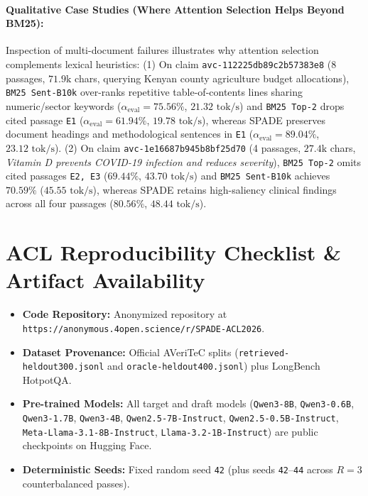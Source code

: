 \documentclass[11pt]{article}
\begin{document}
\paragraph{Qualitative Case Studies (Where Attention Selection Helps Beyond BM25):}
Inspection of multi-document failures illustrates why attention selection complements lexical heuristics: (1) On claim \texttt{avc-112225db89c2b57383e8} (8 passages, $71.9\text{k}$ chars, querying Kenyan county agriculture budget allocations), \texttt{BM25 Sent-B10k} over-ranks repetitive table-of-contents lines sharing numeric/sector keywords ($\alpha_{\text{eval}} = 75.56\%$, $21.32\text{ tok/s}$) and \texttt{BM25 Top-2} drops cited passage \texttt{E1} ($\alpha_{\text{eval}} = 61.94\%$, $19.78\text{ tok/s}$), whereas SPADE preserves document headings and methodological sentences in \texttt{E1} ($\alpha_{\text{eval}} = 89.04\%$, $23.12\text{ tok/s}$). (2) On claim \texttt{avc-1e16687b945b8bf25d70} (4 passages, $27.4\text{k}$ chars, \textit{Vitamin D prevents COVID-19 infection and reduces severity}), \texttt{BM25 Top-2} omits cited passages \texttt{E2, E3} ($69.44\%$, $43.70\text{ tok/s}$) and \texttt{BM25 Sent-B10k} achieves $70.59\%$ ($45.55\text{ tok/s}$), whereas SPADE retains high-saliency clinical findings across all four passages ($80.56\%$, $48.44\text{ tok/s}$).

\clearpage
\section{ACL Reproducibility Checklist \& Artifact Availability}
\label{app:reproducibility}
\begin{itemize}
    \item \textbf{Code Repository:} Anonymized repository at \nolinkurl{https://anonymous.4open.science/r/SPADE-ACL2026}.
    \item \textbf{Dataset Provenance:} Official AVeriTeC splits (\nolinkurl{retrieved-heldout300.jsonl} and \nolinkurl{oracle-heldout400.jsonl}) plus LongBench HotpotQA.
    \item \textbf{Pre-trained Models:} All target and draft models (\texttt{Qwen3-8B}, \texttt{Qwen3-0.6B}, \texttt{Qwen3-1.7B}, \texttt{Qwen3-4B}, \texttt{Qwen2.5-7B-Instruct}, \texttt{Qwen2.5-0.5B-Instruct}, \texttt{Meta-Llama-3.1-8B-Instruct}, \texttt{Llama-3.2-1B-Instruct}) are public checkpoints on Hugging Face.
    \item \textbf{Deterministic Seeds:} Fixed random seed \texttt{42} (plus seeds \texttt{42}--\texttt{44} across $R=3$ counterbalanced passes).
\end{itemize}
\end{document}

